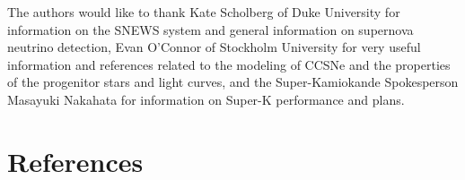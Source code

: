 \documentclass[12pt, letterpaper]{article}
\begin{document}
The authors would like to thank Kate Scholberg of Duke University for
information on the SNEWS system and general information on supernova
neutrino detection, Evan O'Connor of Stockholm University for
very useful information and references related to the modeling of CCSNe
and the properties of the progenitor stars and light curves, and the
Super-Kamiokande Spokesperson Masayuki Nakahata for information on
Super-K performance and plans.

\section{References}

 

\end{document}

